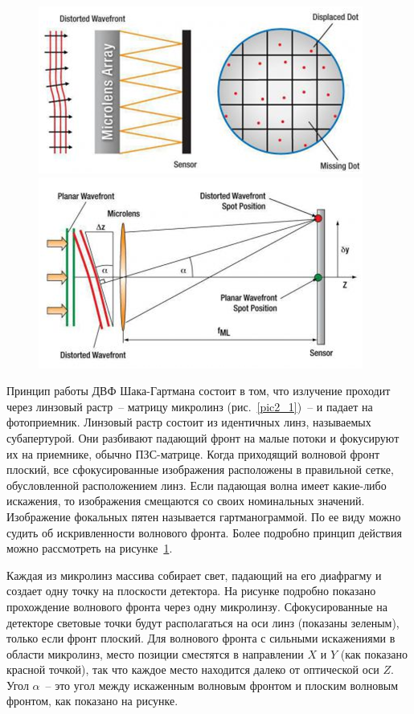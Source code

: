 \documentclass[pscyr,titlepage]{hedreport}
\newcommand{\pic}[1]{\ref{pic#1}}
\begin{document}
\begin{figure}[ht]
  \center
  \includegraphics[width=.47\textwidth]{sl_2_1} \hfill
  \includegraphics[width=.47\textwidth]{sl_2_2} \\
  \parbox{.47\textwidth}{ \caption{} \label{pic2_1} } \hfill
  \parbox{.47\textwidth}{ \caption{} \label{pic2_2} }
\end{figure}

Принцип работы ДВФ Шака-Гартмана состоит в том, что излучение проходит через
линзовый растр~-- матрицу микролинз (рис.~\pic{2_1})~-- и падает на
фотоприемник. Линзовый растр состоит из идентичных линз, называемых
субапертурой. Они разбивают падающий фронт на малые потоки и фокусируют их на
приемнике, обычно ПЗС-матрице. Когда приходящий волновой фронт плоский, все
сфокусированные изображения расположены в правильной сетке, обусловленной
расположением линз. Если падающая волна имеет какие-либо искажения, то
изображения смещаются со своих номинальных значений. Изображение фокальных пятен
называется гартманограммой. По ее виду можно судить об искривленности волнового
фронта. Более подробно принцип действия можно рассмотреть на рисунке~\pic{2_2}.

Каждая из микролинз массива собирает свет, падающий на его диафрагму и создает
одну точку на плоскости детектора. На рисунке подробно показано прохождение
волнового фронта через одну микролинзу. Сфокусированные на детекторе световые
точки будут располагаться на оси линз (показаны зеленым), только если фронт
плоский. Для волнового фронта с сильными искажениями в области микролинз, место
позиции сместятся в направлении \( X \) и \( Y \) (как показано красной точкой),
так что каждое место находится далеко от оптической оси \( Z \). Угол
\( \alpha \)~-- это угол между искаженным волновым фронтом и плоским волновым
фронтом, как показано на рисунке.
\end{document}
